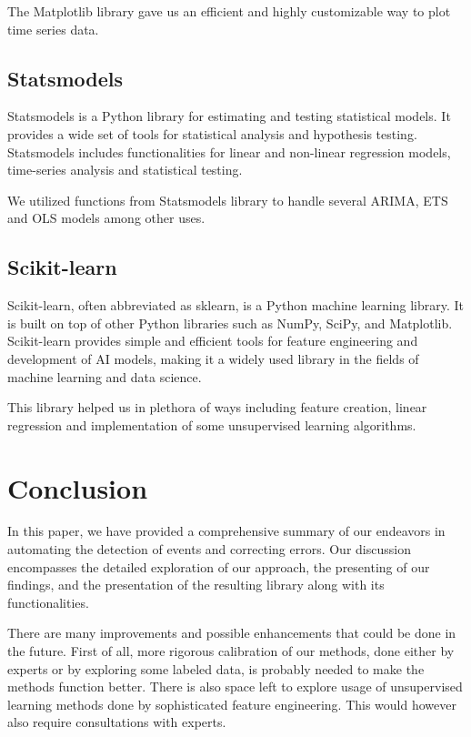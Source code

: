 \documentclass[12pt,a4paper]{article}
\begin{document}
The Matplotlib library gave us an efficient and highly customizable way to plot time series data.

\subsection{Statsmodels \cite{seabold2010statsmodels}}

Statsmodels is a Python library for estimating and testing statistical models. It provides a wide set of tools for statistical analysis and hypothesis testing. Statsmodels includes functionalities for linear and non-linear regression models, time-series analysis and statistical testing.

We utilized functions from Statsmodels library to handle several ARIMA, ETS and OLS models among other uses.

\subsection{Scikit-learn \cite{pedregosa2011scikit}}

Scikit-learn, often abbreviated as sklearn, is a Python machine learning library. It is built on top of other Python libraries such as NumPy, SciPy, and Matplotlib. Scikit-learn provides simple and efficient tools for feature engineering and development of AI models, making it a widely used library in the fields of machine learning and data science.

This library helped us in plethora of ways including feature creation, linear regression and implementation of some unsupervised learning algorithms.




\newpage
\section{Conclusion}


In this paper, we have provided a comprehensive summary of our endeavors in automating the detection of events and correcting errors. Our discussion encompasses the detailed exploration of our approach, the presenting of our findings, and the presentation of the resulting library along with its functionalities.

There are many improvements and possible enhancements that could be done in the future. First of all, more rigorous calibration of our methods, done either by experts or by exploring some labeled data, is probably needed to make the methods function better. There is also space left to explore usage of unsupervised learning methods done by sophisticated feature engineering. This would however also require consultations with experts.
\end{document}
